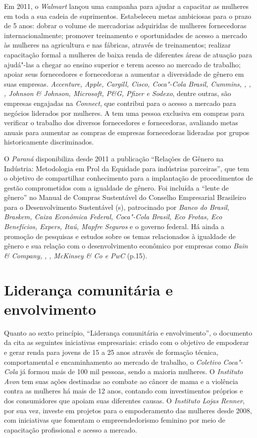 Em 2011, o \emph{Walmart} lançou uma campanha para ajudar a capacitar as
mulheres em toda a sua cadeia de suprimentos. Estabeleceu metas
ambiciosas para o prazo de 5 anos: dobrar o volume de mercadorias
adquiridas de mulheres fornecedoras internacionalmente; promover
treinamento e oportunidades de acesso a mercado às mulheres na
agricultura e nas fábricas, através de treinamentos; realizar
capacitação formal a mulheres de baixa renda de diferentes áreas de
atuação para ajudá"-las a chegar ao ensino superior e terem acesso ao
mercado de trabalho; apoiar seus fornecedores e fornecedoras a aumentar
a diversidade de gênero em suas empresas. \emph{Accenture, Apple,
Cargill, Cisco, Coca"-Cola Brasil, Cummins, , , , Johnson \&
Johnson, Microsoft, P\&G, Pfizer e Sodexo}, dentre outras, são empresas
engajadas na \emph{ Connect}, que contribui para o acesso a
mercado para negócios liderados por mulheres. A \emph{} tem uma
pessoa exclusiva em compras para verificar o trabalho dos diversos
fornecedores e fornecedoras, avaliando metas anuais para aumentar as
compras de empresas fornecedoras lideradas por grupos historicamente
discriminados.

O \emph{ Paraná} disponibiliza desde 2011 a publicação ``Relações de
Gênero na Indústria: Metodologia  em Prol da Equidade para
indústrias parceiras'', que tem o objetivo de compartilhar conhecimento
para a implantação de procedimentos de gestão comprometidos com a
igualdade de gênero. Foi incluída a ``lente de gênero'' no Manual de
Compras Sustentável do Conselho Empresarial Brasileiro para o
Desenvolvimento Sustentável (s), patrocinado por \emph{Banco do
Brasil, Braskem, Caixa Econômica Federal, Coca"-Cola Brasil, Eco Frotas,
Eco Benefícios, Expers, Itaú, Mapfre Seguros} e o governo federal. Há
ainda a promoção de pesquisas e estudos sobre os temas relacionados à
igualdade de gênero e sua relação com o desenvolvimento econômico por
empresas como \emph{Bain \& Company, , , McKinsey \& Co e PwC}
(p.15).

\section{Liderança comunitária e envolvimento}

Quanto ao sexto princípio, ``Liderança comunitária e envolvimento'', o
documento da  cita as seguintes iniciativas empresariais: criado com
o objetivo de empoderar e gerar renda para jovens de 15 a 25 anos
através de formação técnica, comportamental e encaminhamento ao mercado
de trabalho, o \emph{Coletivo Coca"-Cola} já formou mais de 100 mil
pessoas, sendo a maioria mulheres. O \emph{Instituto Avon} tem suas
ações destinadas ao combate ao câncer de mama e a violência contra as
mulheres há mais de 12 anos, contando com investimentos próprios e dos
consumidores que apoiam suas diferentes causas. O \emph{Instituto Lojas
Renner}, por sua vez, investe em projetos para o empoderamento das
mulheres desde 2008, com iniciativas que fomentam o empreendedorismo
feminino por meio de capacitação profissional e acesso a mercado.

